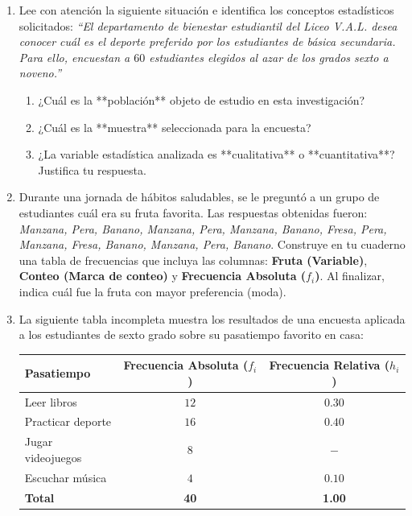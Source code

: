 \documentclass[12pt, letterpaper]{article}
\begin{document}
	\begin{enumerate}[itemsep=0.7cm]
		
		\item Lee con atención la siguiente situación e identifica los conceptos estadísticos solicitados: 
		\textit{``El departamento de bienestar estudiantil del Liceo V.A.L. desea conocer cuál es el deporte preferido por los estudiantes de básica secundaria. Para ello, encuestan a $60$ estudiantes elegidos al azar de los grados sexto a noveno.''}
		\begin{enumerate}[label=\alph*., itemsep=0.2cm, topsep=0.2cm]
			\item ¿Cuál es la **población** objeto de estudio en esta investigación?
			\item ¿Cuál es la **muestra** seleccionada para la encuesta?
			\item ¿La variable estadística analizada es **cualitativa** o **cuantitativa**? Justifica tu respuesta.
		\end{enumerate}
		
		\item Durante una jornada de hábitos saludables, se le preguntó a un grupo de estudiantes cuál era su fruta favorita. Las respuestas obtenidas fueron: 
		\textit{Manzana, Pera, Banano, Manzana, Pera, Manzana, Banano, Fresa, Pera, Manzana, Fresa, Banano, Manzana, Pera, Banano}.
		Construye en tu cuaderno una tabla de frecuencias que incluya las columnas: \textbf{Fruta (Variable)}, \textbf{Conteo (Marca de conteo)} y \textbf{Frecuencia Absoluta ($f_i$)}. Al finalizar, indica cuál fue la fruta con mayor preferencia (moda).
		
		\item La siguiente tabla incompleta muestra los resultados de una encuesta aplicada a los estudiantes de sexto grado sobre su pasatiempo favorito en casa:
		
		\begin{table}[h]
			\centering
			\begin{tabular}{lcc}
				\toprule
				\textbf{Pasatiempo} & \textbf{Frecuencia Absoluta ($f_i$)} & \textbf{Frecuencia Relativa ($h_i$)} \\
				\midrule
				Leer libros & $12$ & $0.30$ \\
				Practicar deporte & $16$ & $0.40$ \\
				Jugar videojuegos & $8$ & $-$ \\
				Escuchar música & $4$ & $0.10$ \\
				\midrule
				\textbf{Total} & \textbf{40} & \textbf{1.00} \\
				\bottomrule
			\end{tabular}
		\end{table}
		

\end{enumerate}
\end{document}
